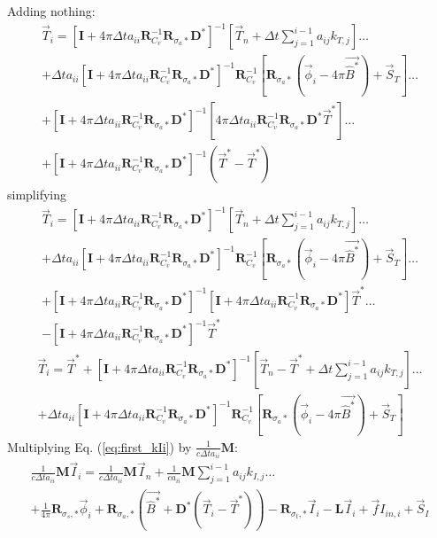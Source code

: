 \documentclass[11pt]{article}
\newcommand{\eqt}[1]{Eq. (\ref{#1})}
\newcommand{\M}{\ensuremath{ \mathbf M}}
\newcommand{\R}{\ensuremath{{\mathbf R}}}
\newcommand{\Pvec}{\ensuremath{ \vec{\widehat{B}^*}}}
\newcommand{\D}{\ensuremath{ \mathbf D}^*}
\newcommand{\I}{\ensuremath{\mathbf{I}}}
\begin{document}
%
%
Adding nothing:
\begin{multline*}
\vec{T}_i = \left[\I + 4\pi\Delta t a_{ii}\R_{C_v}^{-1}\R_{\sigma_a*}\D  \right]^{-1}\left[\vec{T}_n + \Delta t \sum_{j=1}^{i-1}{a_{ij} k_{T,j}   }\right] \dots \\
+ \Delta t a_{ii}\left[\I+ 4\pi\Delta t a_{ii}\R_{C_v}^{-1}\R_{\sigma_a*}\D  \right]^{-1}
\R_{C_v}^{-1}\left[\R_{\sigma_a*} \left(\vec{\phi}_i -  4\pi\Pvec\right) + \vec{S}_T \right]\dots \\
+\left[\I+ 4\pi\Delta t a_{ii}\R_{C_v}^{-1}\R_{\sigma_a*}\D  \right]^{-1}
\left[ 4\pi\Delta t a_{ii} \R_{C_v}^{-1}\R_{\sigma_a*}  \D\vec{T}^* \right]\dots \\
+ \left[\I + 4\pi\Delta t a_{ii}\R_{C_v}^{-1}\R_{\sigma_a*}\D  \right]^{-1} \left( \vec{T}^* - \vec{T}^*\right)
\end{multline*}
%
%
simplifying
\begin{multline*}
\vec{T}_i = \left[\I + 4\pi\Delta t a_{ii}\R_{C_v}^{-1}\R_{\sigma_a*}\D  \right]^{-1}\left[\vec{T}_n + \Delta t \sum_{j=1}^{i-1}{a_{ij} k_{T,j}   }\right] \dots \\
+ \Delta t a_{ii}\left[\I + 4\pi\Delta t a_{ii}\R_{C_v}^{-1}\R_{\sigma_a*}\D  \right]^{-1}
\R_{C_v}^{-1}\left[\R_{\sigma_a*}\left(\vec{\phi}_i - 4\pi\Pvec\right) + \vec{S}_T \right]\dots \\
+\left[\I+ 4\pi\Delta t a_{ii}\R_{C_v}^{-1}\R_{\sigma_a*}\D  \right]^{-1}
\left[ \I + 4\pi\Delta t a_{ii} \R_{C_v}^{-1}\R_{\sigma_a*} \D\right]\vec{T}^* \dots \\
- \left[\I + 4\pi\Delta t a_{ii}\R_{C_v}^{-1}\R_{\sigma_a*}\D  \right]^{-1} \vec{T}^* 
\end{multline*}
%
%
%
\begin{multline}
\vec{T}_i = \vec{T}^*   + \left[\I+ 4\pi\Delta t a_{ii}\R_{C_v}^{-1}\R_{\sigma_a*}\D  \right]^{-1}\left[\vec{T}_n -\vec{T}^* + \Delta t \sum_{j=1}^{i-1}{a_{ij} k_{T,j}   }\right] \dots \\
+ \Delta t a_{ii}\left[\I + 4\pi\Delta t a_{ii}\R_{C_v}^{-1}\R_{\sigma_a*}\D  \right]^{-1}\R_{C_v}^{-1}
\left[ \R_{\sigma_a*}\left(\vec{\phi}_i - 4\pi\Pvec  \right) + \vec{S}_T \right]
\label{eq:Ti_iso}
\end{multline}
%
Multiplying \eqt{eq:first_kIi} by $\frac{1}{c\Delta t a_{ii}}\M$:
\begin{multline}
\frac{1}{c\Delta t a_{ii}}\M\vec{I}_i = \frac{1}{c\Delta t a_{ii}}\M\vec{I}_n + \frac{1}{c a_{ii}} \M \sum_{j=1}^{i-1}{a_{ij} k_{I,j}   } \dots \\
+ 
\frac{1}{4\pi}\R_{\sigma_s,*}\vec{\phi}_i + 
\R_{\sigma_a,*}\left(\Pvec + \D\left(\vec{T}_i -\vec{T}^*  \right)   \right)- \R_{\sigma_t,*} \vec{I}_i - \mathbf{L}\vec{I}_i + \vec{f}I_{in,i} + \vec{S}_I
\label{eq:kIi_second}
\end{multline}
\end{document}
